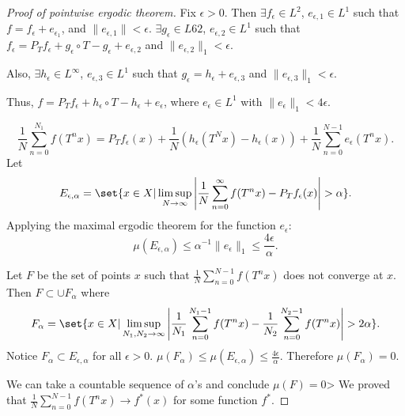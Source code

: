 \documentclass{article}
\begin{document}
\begin{proof}[Proof of pointwise ergodic theorem]
  Fix $\epsilon > 0$.
  Then $\exists f_\epsilon \in L^2$, $e_{\epsilon,1} \in L^1$ such that $f = f_\epsilon + e_{\epsilon_1}$, and $\|e_{\epsilon,1}\| < \epsilon$.
  $\exists g_\epsilon \in L62$, $e_{\epsilon,2} \in L^1$ such that $f_\epsilon = P_T f_\epsilon + g_\epsilon \circ T - g_\epsilon + e_{\epsilon,2}$ and $\|e_{\epsilon,2}\|_1 < \epsilon$.

  Also, $\exists h_\epsilon \in L^\infty$, $e_{\epsilon, 3} \in L^1$ such that $g_\epsilon = h_\epsilon + e_{\epsilon,3}$ and $\|e_{\epsilon,3}\|_1 < \epsilon$.

  Thus, $f = P_T f_\epsilon + h_\epsilon \circ T - h_\epsilon + e_\epsilon$, where $e_\epsilon \in L^1$ with $\|e_\epsilon\|_1 < 4\epsilon$.

  \begin{equation*}
    \frac{1}{N} \sum_{n=0}^{N_1} f(T^nx) = P_T f_\epsilon(x) + \frac{1}{N} \left(h_\epsilon(T^N x) - h_\epsilon(x)\right) + \frac{1}{N} \sum_{n=0}^{N-1} e_\epsilon(T^nx).
  \end{equation*}
  Let
  \begin{equation*}E_{\epsilon,\alpha} = \set{x \in X | \limsup_{N \to \infty} \left|\frac{1}{N} \sum_{n=0}^\infty f(T^n x) - P_T f_\epsilon(x)\right| > \alpha}.\end{equation*}
  Applying the maximal ergodic theorem for the function $e_\epsilon$:
  \begin{equation*}
    \mu(E_{\epsilon,\alpha}) \leq \alpha^{-1} \|e_\epsilon\|_1 \leq \frac{4\epsilon}{\alpha}.
  \end{equation*}

  Let $F$ be the set of points $x$ such that $\frac{1}{N} \sum_{n=0}^{N-1} f(T^nx)$ does not converge at $x$.
  Then $F \subset \cup F_\alpha$ where
  \begin{equation*}
    F_\alpha = \set{x \in X | \limsup_{N_1, N_2 \to \infty} \left|\frac{1}{N_1} \sum_{n=0}^{N_1 - 1} f(T^n x) - \frac{1}{N_2} \sum_{n=0}^{N_2 - 1} f(T^n x)\right| > 2\alpha}.
  \end{equation*}
  Notice $F_\alpha \subset E_{\epsilon,\alpha}$ for all $\epsilon > 0$.
  $\mu(F_\alpha) \leq \mu(E_{\epsilon,\alpha}) \leq \frac{4\epsilon}{\alpha}$.
  Therefore $\mu(F_\alpha) = 0$.

  We can take a countable sequence of $\alpha$'s and conclude $\mu(F) = 0$>
  We proved that $\frac{1}{N} \sum_{n=0}^{N-1} f(T^n x) \to f^*(x)$ for some function $f^*$.


\end{proof}
\end{document}
